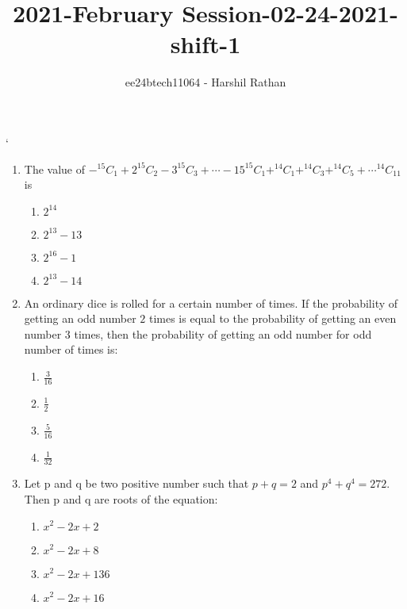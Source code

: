 \documentclass[journal,12pt,twocolumn]{IEEEtran}
\theoremstyle{remark}
\begin{document}

\vspace{3cm}

\title{2021-February Session-02-24-2021-shift-1}
\author{ee24btech11064 - Harshil Rathan}
\maketitle
\newpage
\bigskip

\renewcommand{\thefigure}{\theenumi}
`\renewcommand{\thetable}{\theenumi}
\begin{enumerate}
\item The value of $-^{15}C_{1}+2^{15}C_{2}-3^{15}C_{3}+\cdots -15^{15}C_{1}+^{14}C_{1}+^{14}C_{3}+^{14}C_{5}+\cdots^{14}C_{11}$ is 
\begin{multicols}{2}
\begin{enumerate}
    \item $2^{14}$
    \item $2^{13}-13$
    \item $2^{16}-1$
    \item $2^{13}-14$ 
\end{enumerate}
\end{multicols}
\bigskip
\item An ordinary dice is rolled for a certain number of times. If the probability of getting an odd number $2$ times is equal to the probability of getting an even number $3$ times, then the probability of getting an odd number for odd number of times is: 
\begin{multicols}{2}
\begin{enumerate}
    \item $\frac{3}{16}$
    \item $\frac{1}{2}$
    \item $\frac{5}{16}$
    \item $\frac{1}{32}$
\end{enumerate}
\end{multicols}
\bigskip
\item Let p and q be two positive number such that $p+q=2$ and $p^4+q^4=272$. Then p and q are roots of the equation:
\begin{multicols}{2}
\begin{enumerate}
       \item $x^2-2x+2$
       \item $x^2-2x+8$
       \item $x^2-2x+136$
       \item $x^2-2x+16$
\end{enumerate}

\end{multicols}
\end{enumerate}
\end{document}
